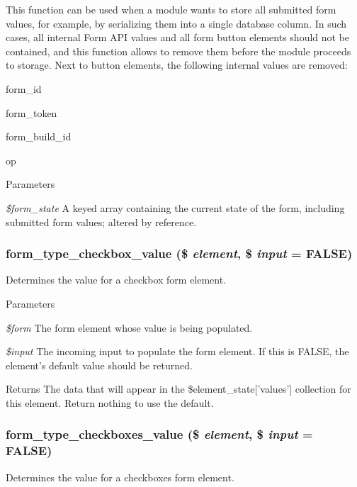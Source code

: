This function can be used when a module wants to store all submitted form values, for example, by serializing them into a single database column. In such cases, all internal Form API values and all form button elements should not be contained, and this function allows to remove them before the module proceeds to storage. Next to button elements, the following internal values are removed:
\begin{DoxyItemize}
\item form\_\-id
\item form\_\-token
\item form\_\-build\_\-id
\item op
\end{DoxyItemize}


\begin{DoxyParams}{Parameters}
\item[{\em \$form\_\-state}]A keyed array containing the current state of the form, including submitted form values; altered by reference. \end{DoxyParams}
\hypertarget{group__form__api_gae6014b94202e1d6e5c55421fc5b7d368}{
\subsubsection[{form\_\-type\_\-checkbox\_\-value}]{\setlength{\rightskip}{0pt plus 5cm}form\_\-type\_\-checkbox\_\-value (\$ {\em element}, \/  \$ {\em input} = {\ttfamily FALSE})}}
\label{group__form__api_gae6014b94202e1d6e5c55421fc5b7d368}
Determines the value for a checkbox form element.


\begin{DoxyParams}{Parameters}
\item[{\em \$form}]The form element whose value is being populated. \item[{\em \$input}]The incoming input to populate the form element. If this is FALSE, the element's default value should be returned.\end{DoxyParams}
\begin{DoxyReturn}{Returns}
The data that will appear in the \$element\_\-state\mbox{[}'values'\mbox{]} collection for this element. Return nothing to use the default. 
\end{DoxyReturn}
\hypertarget{group__form__api_gaab8c7b8878c056d35d6000bb0fab3b2b}{
\subsubsection[{form\_\-type\_\-checkboxes\_\-value}]{\setlength{\rightskip}{0pt plus 5cm}form\_\-type\_\-checkboxes\_\-value (\$ {\em element}, \/  \$ {\em input} = {\ttfamily FALSE})}}
\label{group__form__api_gaab8c7b8878c056d35d6000bb0fab3b2b}
Determines the value for a checkboxes form element.


